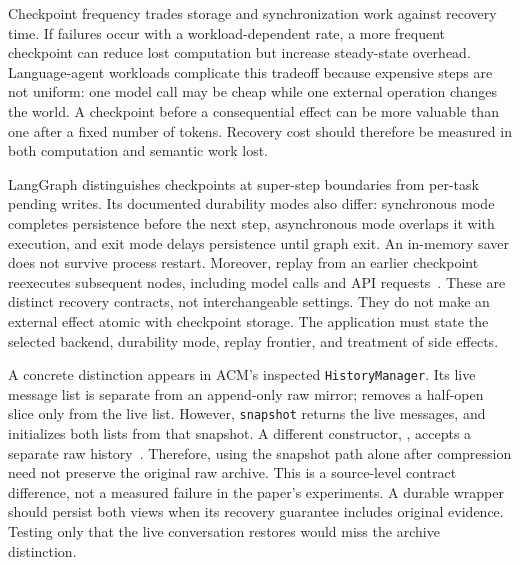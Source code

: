 Checkpoint frequency trades storage and synchronization work against recovery time. If failures occur with a workload-dependent rate, a more frequent checkpoint can reduce lost computation but increase steady-state overhead. Language-agent workloads complicate this tradeoff because expensive steps are not uniform: one model call may be cheap while one external operation changes the world. A checkpoint before a consequential effect can be more valuable than one after a fixed number of tokens. Recovery cost should therefore be measured in both computation and semantic work lost.

LangGraph distinguishes checkpoints at super-step boundaries from per-task pending writes. Its documented durability modes also differ: synchronous mode completes persistence before the next step, asynchronous mode overlaps it with execution, and exit mode delays persistence until graph exit. An in-memory saver does not survive process restart. Moreover, replay from an earlier checkpoint reexecutes subsequent nodes, including model calls and API requests~\cite{cumb2026langgraphcheckpoints}. These are distinct recovery contracts, not interchangeable settings. They do not make an external effect atomic with checkpoint storage. The application must state the selected backend, durability mode, replay frontier, and treatment of side effects.

A concrete distinction appears in ACM's inspected \texttt{HistoryManager}. Its live message list is separate from an append-only raw mirror;  removes a half-open slice only from the live list. However, \texttt{snapshot} returns the live messages, and  initializes both lists from that snapshot. A different constructor, , accepts a separate raw history~\cite{repo_acm2026}. Therefore, using the snapshot path alone after compression need not preserve the original raw archive. This is a source-level contract difference, not a measured failure in the paper's experiments. A durable wrapper should persist both views when its recovery guarantee includes original evidence. Testing only that the live conversation restores would miss the archive distinction.

